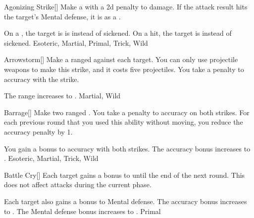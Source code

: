 
\lowercase{\hypertarget{maneuver:Agonizing Strike}{}}\label{maneuver:Agonizing Strike}
\hypertarget{maneuver:Agonizing Strike}{}
\begin{freeability}[Rank 3]{Agonizing Strike}[]
Make a  with a \minus2d penalty to damage.
If the attack result hits the target's Mental defense,
it is  as a .

\rankline
{} On a , the target is is  instead of sickened.
 On a hit, the target is  instead of sickened.
 Esoteric, Martial, Primal, Trick, Wild
\end{freeability}
\vspace{0.25em}



\lowercase{\hypertarget{maneuver:Arrowstorm}{}}\label{maneuver:Arrowstorm}
\hypertarget{maneuver:Arrowstorm}{}
\begin{freeability}[Rank 6]{Arrowstorm}[]
Make a ranged  against each target.
You can only use projectile weapons to make this strike, and it costs five projectiles.
You take a  penalty to accuracy with the strike.

\rankline
{} The range increases to \rnglong.
 Martial, Wild
\end{freeability}
\vspace{0.25em}



\lowercase{\hypertarget{maneuver:Barrage}{}}\label{maneuver:Barrage}
\hypertarget{maneuver:Barrage}{}
\begin{freeability}[Rank 3]{Barrage}[]
Make two ranged .
You take a  penalty to accuracy on both strikes.
For each previous round that you used this ability without moving, you reduce the accuracy penalty by 1.

\rankline
{} You gain a  bonus to accuracy with both strikes.
 The accuracy bonus increases to .
 Esoteric, Martial, Trick, Wild
\end{freeability}
\vspace{0.25em}



\lowercase{\hypertarget{maneuver:Battle Cry}{}}\label{maneuver:Battle Cry}
\hypertarget{maneuver:Battle Cry}{}
\begin{freeability}[Rank 1]{Battle Cry}[]
Each target gains a  bonus to  until the end of the next round.
This does not affect attacks during the current phase.

\rankline
{} Each target also gains a  bonus to Mental defense.
 The accuracy bonus increases to .
 The Mental defense bonus increases to .
 Primal
\end{freeability}
\vspace{0.25em}



